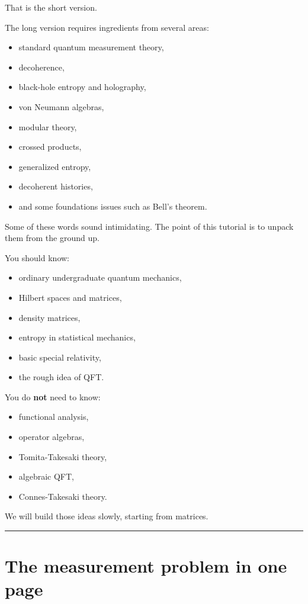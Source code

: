 \documentclass[11pt,a4paper]{article}
\begin{document}
That is the short version.

The long version requires ingredients from several areas:

\begin{itemize}
  \item standard quantum measurement theory,
  \item decoherence,
  \item black-hole entropy and holography,
  \item von Neumann algebras,
  \item modular theory,
  \item crossed products,
  \item generalized entropy,
  \item decoherent histories,
  \item and some foundations issues such as Bell’s theorem.
\end{itemize}

Some of these words sound intimidating. The point of this tutorial is to unpack them from the ground up.

You should know:

\begin{itemize}
  \item ordinary undergraduate quantum mechanics,
  \item Hilbert spaces and matrices,
  \item density matrices,
  \item entropy in statistical mechanics,
  \item basic special relativity,
  \item the rough idea of QFT.
\end{itemize}

You do \textbf{not} need to know:

\begin{itemize}
  \item functional analysis,
  \item operator algebras,
  \item Tomita-Takesaki theory,
  \item algebraic QFT,
  \item Connes-Takesaki theory.
\end{itemize}

We will build those ideas slowly, starting from matrices.

\medskip\hrule\medskip

\section{The measurement problem in one page}
\end{document}
